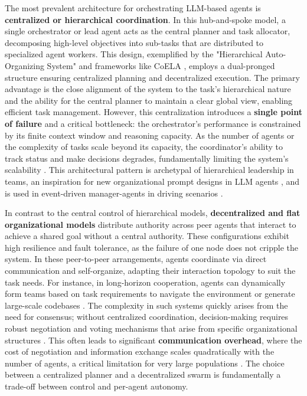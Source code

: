 \documentclass[11pt,a4paper]{article}
\begin{document}
The most prevalent architecture for orchestrating LLM-based agents is \textbf{centralized or hierarchical coordination}. In this hub-and-spoke model, a single orchestrator or lead agent acts as the central planner and task allocator, decomposing high-level objectives into sub-tasks that are distributed to specialized agent workers. This design, exemplified by the "Hierarchical Auto-Organizing System" \cite{arxiv:2403.08282v2} and frameworks like CoELA \cite{arxiv:2307.02485v2}, employs a dual-pronged structure ensuring centralized planning and decentralized execution. The primary advantage is the close alignment of the system to the task's hierarchical nature and the ability for the central planner to maintain a clear global view, enabling efficient task management. However, this centralization introduces a \textbf{single point of failure} and a critical bottleneck: the orchestrator's performance is constrained by its finite context window and reasoning capacity. As the number of agents or the complexity of tasks scale beyond its capacity, the coordinator's ability to track status and make decisions degrades, fundamentally limiting the system's scalability \cite{arxiv:2406.07155v1}. This architectural pattern is archetypal of hierarchical leadership in teams, an inspiration for new organizational prompt designs in LLM agents \cite{arxiv:2403.12482v1}, and is used in event-driven manager-agents in driving scenarios \cite{arxiv:2407.14239v1}.

In contrast to the central control of hierarchical models, \textbf{decentralized and flat organizational models} distribute authority across peer agents that interact to achieve a shared goal without a central authority. These configurations exhibit high resilience and fault tolerance, as the failure of one node does not cripple the system. In these peer-to-peer arrangements, agents coordinate via direct communication and self-organize, adapting their interaction topology to suit the task needs. For instance, in long-horizon cooperation, agents can dynamically form teams based on task requirements to navigate the environment or generate large-scale codebases \cite{arxiv:2406.07155v1}. The complexity in such systems quickly arises from the need for consensus; without centralized coordination, decision-making requires robust negotiation and voting mechanisms that arise from specific organizational structures \cite{arxiv:2405.03825v1}. This often leads to significant \textbf{communication overhead}, where the cost of negotiation and information exchange scales quadratically with the number of agents, a critical limitation for very large populations \cite{arxiv:1712.00600v1}. The choice between a centralized planner and a decentralized swarm is fundamentally a trade-off between control and per-agent autonomy.
\end{document}
